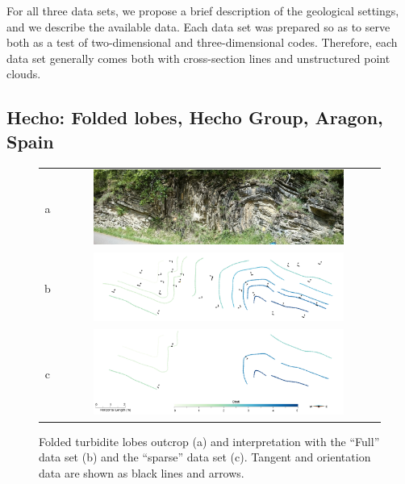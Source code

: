 \documentclass[preprint]{ring20}
\begin{document}
For all three data sets, we propose a brief description of the geological settings, and we describe the available data. Each data set was prepared so as to serve both as a test of two-dimensional and three-dimensional codes. Therefore, each data set generally comes both with cross-section lines and unstructured point clouds.


\subsection{Hecho: Folded lobes, Hecho Group, Aragon, Spain}
\label{sec:Hecho}

\begin{figure}
\centering\begin{tabular}{cc}
a & \includegraphics[width=0.8\textwidth]{Hecho1}\\
b & \includegraphics[width=0.8\textwidth]{Hecho2} \\
c & \includegraphics[width=0.8\textwidth]{Hecho3} \\
\end{tabular}
\caption{Folded turbidite lobes outcrop (a) and interpretation with the ``Full'' data set (b) and the ``sparse'' data set (c). 
Tangent and orientation data are shown as black lines and arrows.}
\label{fig:FLH2D}
\end{figure}
\end{document}
